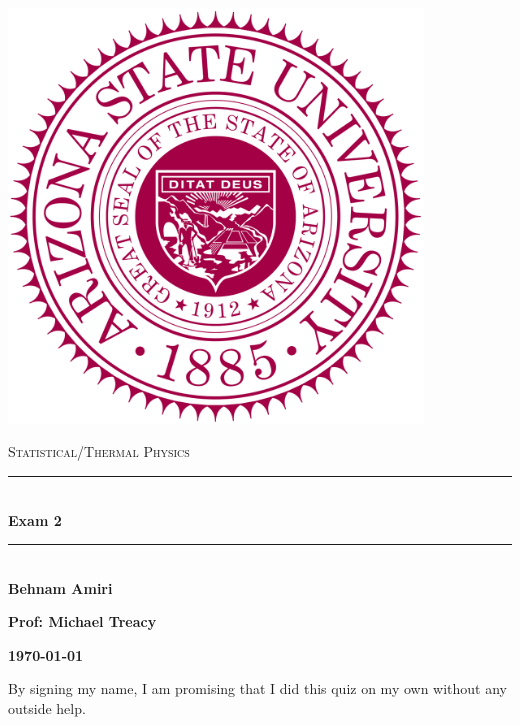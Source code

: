 \documentclass[fleqn]{article}
\begin{document}
  \begin{titlepage}

    \newcommand{\HRule}{\rule{\linewidth}{0.5mm}}

    \center

    \begin{center}
      \includegraphics[height=11cm, width=11cm]{asu.png}
    \end{center}

    \vline

    \textsc{\LARGE Statistical/Thermal Physics}\\[1.5cm]

    \HRule \\[0.5cm]
    { \huge \bfseries Exam 2}\\[0.4cm] 
    \HRule \\[1.0cm]

    \textbf{Behnam Amiri}

    \bigbreak

    \textbf{Prof: Michael Treacy}

    \bigbreak

    \textbf{{\large \today}\\[2cm]}

    \vfill

  \end{titlepage}

  By signing my name, I am promising that I did this quiz on my own without any outside help.

  \vspace{0.5cm}
\end{document}

